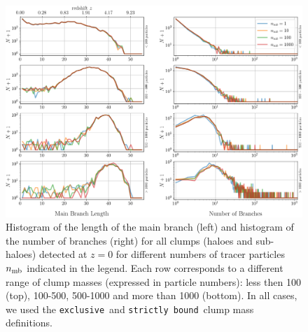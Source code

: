 \documentclass[a4paper,twocolumn,fleqn,usenatbib]{mnras}
\newcommand{\exc}{\texttt{exclusive}}
\newcommand{\sad}{\texttt{strictly bound}}
\begin{document}
\begin{figure}
  \centering
  \includegraphics[width=\textwidth, keepaspectratio]{images/tree-statistics-my-threshold/tree_geometry-ntrace.png}%
  \caption{ Histogram of the length of the main branch (left) and
    histogram of the number of branches (right) for all clumps (haloes
    and sub-haloes) detected at $z=0$ for different numbers of tracer
    particles $n_{\rm mb}$ indicated in the legend.  Each row
    corresponds to a different range of clump masses (expressed in
    particle numbers): less then 100 (top), 100-500, 500-1000 and more
    than 1000 (bottom).  In all cases, we used the \exc\ and
    \sad\ clump mass definitions.
  }%
  \label{fig:ntracers_mbl_nbranch}
\end{figure}
\end{document}

